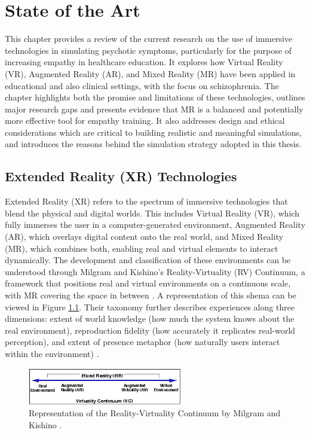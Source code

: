 \chapter{State of the Art}
\label{ch:background}

This chapter provides a review of the current research on the use of immersive technologies in simulating psychotic symptoms, particularly for the purpose of increasing empathy in healthcare education. It explores how Virtual Reality (VR), Augmented Reality (AR), and Mixed Reality (MR) have been applied in educational and also clinical settings, with the focus on schizophrenia. The chapter highlights both the promise and limitations of these technologies, outlines major research gaps and presents evidence that MR is a balanced and potentially more effective tool for empathy training. It also addresses design and ethical considerations which are critical to building realistic and meaningful simulations, and introduces the reasons behind the simulation strategy adopted in this thesis.

\section{Extended Reality (XR) Technologies}
Extended Reality (XR) refers to the spectrum of immersive technologies that blend the physical and digital worlds. This includes Virtual Reality (VR), which fully immerses the user in a computer-generated environment, Augmented Reality (AR), which overlays digital content onto the real world, and Mixed Reality (MR), which combines both, enabling real and virtual elements to interact dynamically. The development and classification of these environments can be understood through Milgram and Kishino’s Reality-Virtuality (RV) Continuum, a framework that positions real and virtual environments on a continuous scale, with MR covering the space in between \cite{milgram1994}. A representation of this shema can be viewed in Figure \ref{fig:milgram}. Their taxonomy further describes experiences along three dimensions: extent of world knowledge (how much the system knows about the real environment), reproduction fidelity (how accurately it replicates real-world perception), and extent of presence metaphor (how naturally users interact within the environment) \cite{Skarbez2021}. 

\vspace{1em}

\begin{figure}[h!] 
    \centering 
    \includegraphics[width=0.6\textwidth]{../../Figures/milgram.jpeg} 
    \caption{Representation of the Reality-Virtuality Continuum by Milgram and Kishino \cite{milgram1994}.} 
    \label{fig:milgram} 
\end{figure}

